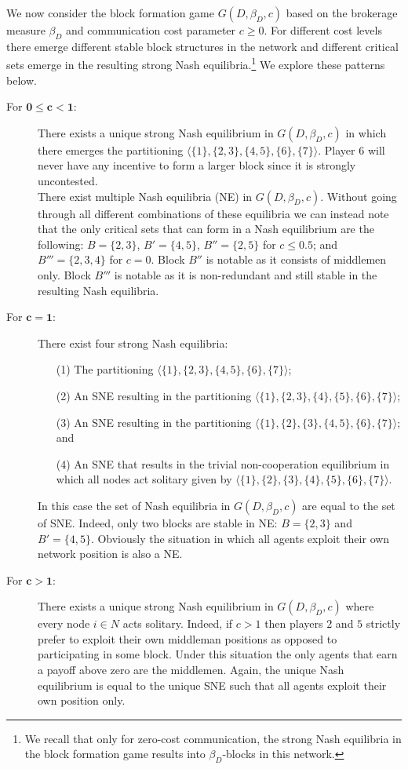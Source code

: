 We now consider the block formation game $G (D, \beta_D ,c)$ based on the brokerage measure $\beta_D$ and communication cost parameter $c \geqslant 0$. For different cost levels there emerge different stable block structures in the network and different critical sets emerge in the resulting strong Nash equilibria.\footnote{We recall that only for zero-cost communication, the strong Nash equilibria in the block formation game results into $\beta_D$-blocks in this network.} We explore these patterns below.
\begin{description}
\item[For $\mathbf{0 \leqslant c < 1}$:]
There exists a unique strong Nash equilibrium in $G (D, \beta_D ,c)$ in which there emerges the partitioning $\langle \{ 1 \} , \{2,3\} , \{4,5\} , \{ 6 \} , \{ 7 \} \rangle$. Player $6$ will never have any incentive to form a larger block since it is strongly uncontested.
\\
There exist multiple Nash equilibria (NE) in $G (D, \beta_D ,c)$. Without going through all different combinations of these equilibria we can instead note that the only critical sets that can form in a Nash equilibrium are the following: $B = \{2,3\}$, $B' = \{4,5\}$, $B'' = \{2,5\}$ for $c \leqslant 0.5$; and $B''' = \{2,3,4\}$ for $c=0$. Block $B''$ is notable as it consists of middlemen only. Block $B'''$ is notable as it is non-redundant and still stable in the resulting Nash equilibria.

\item[For $\mathbf{c = 1}$:]
There exist four strong Nash equilibria: 
\begin{itemize}
\item[(1)] The partitioning $\langle \{ 1 \} , \{2,3\} , \{4,5\} , \{ 6 \} , \{ 7 \} \rangle$; 
\item[(2)] An SNE resulting in the partitioning $\langle \{ 1 \} , \{2,3\} , \{4 \}, \{5\} , \{ 6 \} , \{ 7 \} \rangle$; 
\item[(3)] An SNE resulting in the partitioning $\langle \{ 1 \} , \{2\} , \{3\} , \{4,5\} , \{ 6 \} , \{ 7 \} \rangle$; and 
\item[(4)] An SNE that results in the trivial non-cooperation equilibrium in which all nodes act solitary given by $\langle \{ 1 \} , \{ 2\} ,\{ 3\} , \{ 4 \} , \{ 5 \} , \{ 6 \} , \{ 7 \} \rangle$.
\end{itemize}
In this case the set of Nash equilibria in $G (D, \beta_D ,c)$ are equal to the set of SNE. Indeed, only two blocks are stable in NE: $B=\{2,3\}$ and $B'=\{4,5\}$. Obviously the situation in which all agents exploit their own network position is also a NE.

\item[For $\mathbf{c > 1}$:]
There exists a unique strong Nash equilibrium in $G (D, \beta_D ,c)$ where every node $i \in N$ acts solitary. Indeed, if $c > 1$ then players $2$ and $5$ strictly prefer to exploit their own middleman positions as opposed to participating in some block. Under this situation the only agents that earn a payoff above zero are the middlemen. Again, the unique Nash equilibrium is equal to the unique SNE such that all agents exploit their own position only.
\end{description}
